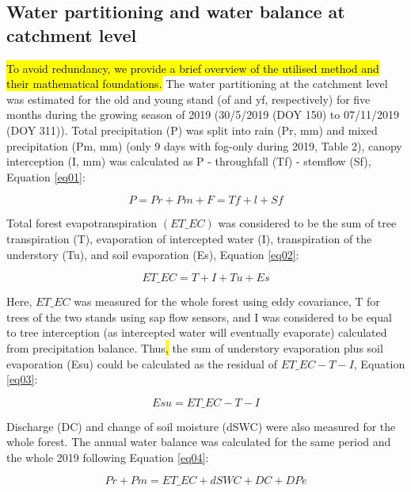 \documentclass[10pt,letterpaper]{article}
\begin{document}
\subsection{Water partitioning and water balance at catchment level}

\hl{To avoid redundancy, we provide a brief overview of the utilised method and their mathematical foundations. }The water partitioning at the catchment level was estimated for the old and young stand (of and yf, respectively) for five months during the growing season of 2019 (30/5/2019 (DOY 150) to 07/11/2019 (DOY 311)). Total precipitation (P) was split into rain (Pr, mm) and mixed precipitation (Pm, mm) (only 9 days with fog-only during 2019, Table 2), canopy interception (I, mm) was calculated as P - throughfall (Tf) - stemflow (Sf), Equation \ref{eq01}:

\begin{equation}\label{eq01}
	P = Pr + Pm + F = Tf + l + Sf
\end{equation}

Total forest evapotranspiration $(ET\_EC)$ was considered to be the sum of tree transpiration (T), evaporation of intercepted water (I), transpiration of the understory (Tu), and soil evaporation (Es),  Equation \ref{eq02}:

\begin{equation}\label{eq02}
	ET\_EC = T + I + Tu + Es
\end{equation}

Here, $ET\_EC$ was measured for the whole forest using eddy covariance, T for trees of the two stands using sap flow sensors, and I was considered  to be equal to tree interception (as intercepted water will eventually evaporate) calculated from precipitation balance. Thus\hl{, }the sum of understory evaporation plus soil evaporation (Esu) could be calculated as the residual of $ET\_EC - T - I$, Equation \ref{eq03}:

\begin{equation}\label{eq03}
	Esu = ET\_EC - T - I
\end{equation}

Discharge (DC) and change of soil moisture (dSWC) were also measured for the whole forest. 
The annual water balance was calculated for the same period and the whole 2019 following Equation \ref{eq04}:

\begin{equation}\label{eq04}
	Pr + Pm = ET\_EC + dSWC + DC + DPe
\end{equation}
\end{document}
